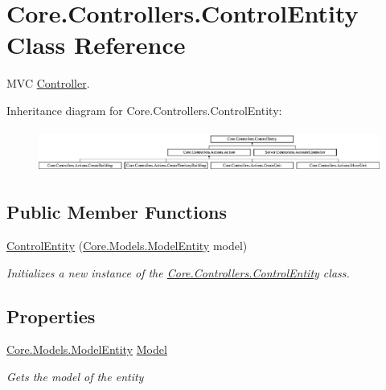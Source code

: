 \hypertarget{classCore_1_1Controllers_1_1ControlEntity}{}\section{Core.\+Controllers.\+Control\+Entity Class Reference}
\label{classCore_1_1Controllers_1_1ControlEntity}


M\+V\+C \hyperlink{classCore_1_1Controllers_1_1Controller}{Controller}.  


Inheritance diagram for Core.\+Controllers.\+Control\+Entity\+:\begin{figure}[H]
\begin{center}
\leavevmode
\includegraphics[height=1.418919cm]{classCore_1_1Controllers_1_1ControlEntity}
\end{center}
\end{figure}
\subsection*{Public Member Functions}
\begin{DoxyCompactItemize}
\item 
\hyperlink{classCore_1_1Controllers_1_1ControlEntity_ae658365fdb72c178ad05c27d258fcca2}{Control\+Entity} (\hyperlink{classCore_1_1Models_1_1ModelEntity}{Core.\+Models.\+Model\+Entity} model)
\begin{DoxyCompactList}\small\item\em Initializes a new instance of the \hyperlink{classCore_1_1Controllers_1_1ControlEntity}{Core.\+Controllers.\+Control\+Entity} class. \end{DoxyCompactList}\end{DoxyCompactItemize}
\subsection*{Properties}
\begin{DoxyCompactItemize}
\item 
\hyperlink{classCore_1_1Models_1_1ModelEntity}{Core.\+Models.\+Model\+Entity} \hyperlink{classCore_1_1Controllers_1_1ControlEntity_ad5b9626748577b6af9b63c5d83e7739a}{Model}
\begin{DoxyCompactList}\small\item\em Gets the model of the entity \end{DoxyCompactList}\end{DoxyCompactItemize}


